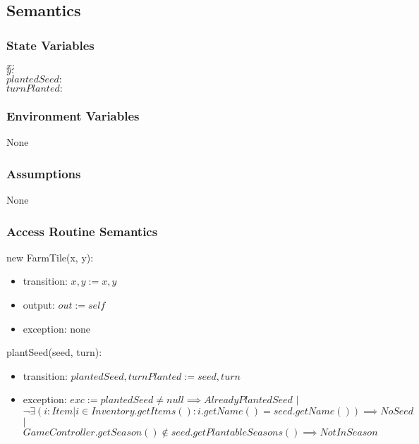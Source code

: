 \documentclass[12pt, titlepage]{article}
\begin{document}
\subsection{Semantics}

\subsubsection{State Variables}
$\mathit{x}:$ \\
$\mathit{y}:$ \\
$\mathit{plantedSeed}:$ \\
$\mathit{turnPlanted}:$ \\

\subsubsection{Environment Variables}

None

\subsubsection{Assumptions}

None

\subsubsection{Access Routine Semantics}

\noindent new FarmTile(x, y):
\begin{itemize}
\item transition: $x, y := x, y$
\item output: $out := self$
\item exception: none
\end{itemize}

\noindent plantSeed(seed, turn):
\begin{itemize}
\item transition: $plantedSeed, turnPlanted := seed, turn$
\item exception: $exc := plantedSeed \neq null \implies AlreadyPlantedSeed$ $|$\\ $  \neg \exists (i : Item | i \in Inventory.getItems() : i.getName() = seed.getName()) \implies NoSeed$ $|$\\ $GameController.getSeason() \notin seed.getPlantableSeasons() \implies NotInSeason$
\end{itemize}
\end{document}
